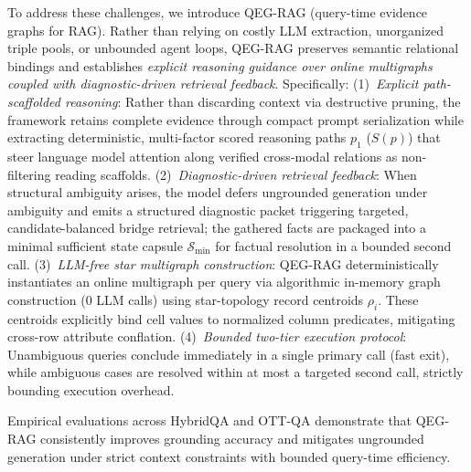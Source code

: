 \documentclass[runningheads]{llncs}
\begin{document}
To address these challenges, we introduce QEG-RAG (query-time evidence graphs for RAG). Rather than relying on costly LLM extraction, unorganized triple pools, or unbounded agent loops, QEG-RAG preserves semantic relational bindings and establishes \emph{explicit reasoning guidance over online multigraphs coupled with diagnostic-driven retrieval feedback}. Specifically:
(1)~\emph{Explicit path-scaffolded reasoning}: Rather than discarding context via destructive pruning, the framework retains complete evidence through compact prompt serialization while extracting deterministic, multi-factor scored reasoning paths $p_1$ ($S(p)$) that steer language model attention along verified cross-modal relations as non-filtering reading scaffolds.
(2)~\emph{Diagnostic-driven retrieval feedback}: When structural ambiguity arises, the model defers ungrounded generation under ambiguity and emits a structured diagnostic packet triggering targeted, candidate-balanced bridge retrieval; the gathered facts are packaged into a minimal sufficient state capsule $\mathcal{S}_{\min}$ for factual resolution in a bounded second call.
(3)~\emph{LLM-free star multigraph construction}: QEG-RAG deterministically instantiates an online multigraph per query via algorithmic in-memory graph construction (0 LLM calls) using star-topology record centroids $\rho_i$. These centroids explicitly bind cell values to normalized column predicates, mitigating cross-row attribute conflation.
(4)~\emph{Bounded two-tier execution protocol}: Unambiguous queries conclude immediately in a single primary call (fast exit), while ambiguous cases are resolved within at most a targeted second call, strictly bounding execution overhead.

Empirical evaluations across HybridQA and OTT-QA demonstrate that QEG-RAG consistently improves grounding accuracy and mitigates ungrounded generation under strict context constraints with bounded query-time efficiency.
\end{document}
